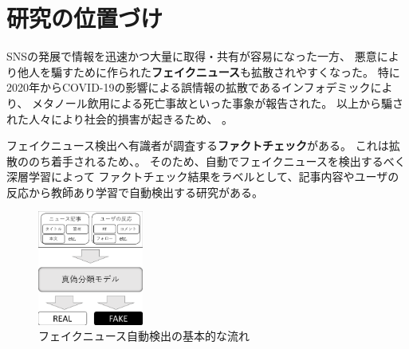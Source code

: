 
\section{研究の位置づけ}

SNSの発展で情報を迅速かつ大量に取得・共有が容易になった一方、
悪意により他人を騙すために作られた\textbf{フェイクニュース}も拡散されやすくなった。
特に2020年からCOVID-19の影響による誤情報の拡散であるインフォデミックにより、
メタノール飲用による死亡事故\cite{iraninfo}といった事象が報告された。
以上から騙された人々により社会的損害が起きるため、
\cite{snsinfo}。

フェイクニュース検出へ有識者が調査する\textbf{ファクトチェック}がある。
これは拡散ののち着手されるため、。
そのため、自動でフェイクニュースを検出するべく深層学習によって
ファクトチェック結果をラベルとして、記事内容やユーザの反応から教師あり学習で自動検出する研究がある\cite{Wang:2018:EEA:3219819.3219903}。


\setlength\intextsep{0pt}
\setlength\textfloatsep{0pt}
\begin{figure}
    \vspace{-5mm}
    \centering
    \includegraphics[width=0.31\textwidth]{figs/base_model.pdf}
    \vspace{-1cm} 
    \caption{フェイクニュース自動検出の基本的な流れ}
    \label{fig:objects}
\end{figure}

